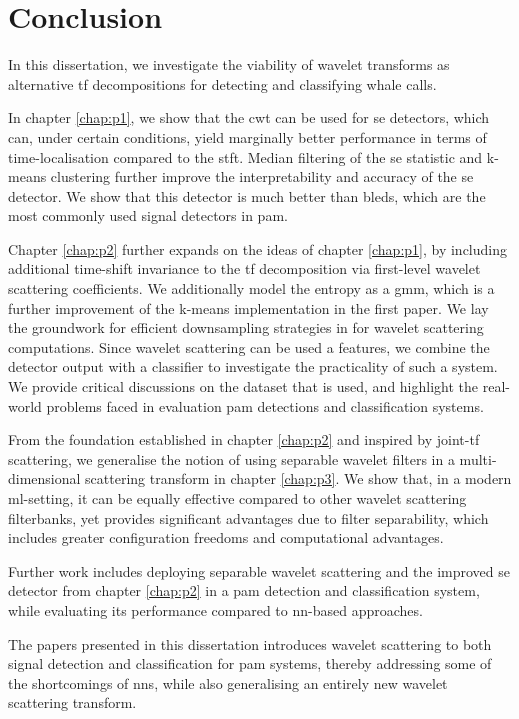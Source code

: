 \chapter{Conclusion}

In this dissertation, we investigate the viability of wavelet transforms as alternative \ac{tf} decompositions for detecting and classifying whale calls. 

In chapter \ref*{chap:p1}, we show that the \ac{cwt} can be used for \ac{se} detectors, which can, under certain conditions, yield marginally better performance in terms of time-localisation compared to the \ac{stft}. Median filtering of the \ac{se} statistic and k-means clustering further improve the interpretability and accuracy of the \ac{se} detector. We show that this detector is much better than \acp{bled}, which are the most commonly used signal detectors in \ac{pam}.

Chapter \ref*{chap:p2} further expands on the ideas of chapter \ref*{chap:p1}, by including additional time-shift invariance to the \ac{tf} decomposition via first-level wavelet scattering coefficients. We additionally model the entropy as a \ac{gmm}, which is a further improvement of the k-means implementation in the first paper. We lay the groundwork for efficient downsampling strategies in for wavelet scattering computations. Since wavelet scattering can be used a features, we combine the detector output with a classifier to investigate the practicality of such a system. We provide critical discussions on the dataset that is used, and highlight the real-world problems faced in evaluation \ac{pam} detections and classification systems.

From the foundation established in chapter \ref*{chap:p2} and inspired by joint-\ac{tf} scattering, we generalise the notion of using separable wavelet filters in a multi-dimensional scattering transform in chapter \ref*{chap:p3}. We show that, in a modern \ac{ml}-setting, it can be equally effective compared to other wavelet scattering filterbanks, yet provides significant advantages due to filter separability, which includes greater configuration freedoms and computational advantages. 

Further work includes deploying separable wavelet scattering and the improved \ac{se} detec\-tor from chapter \ref*{chap:p2} in a \ac{pam} detection and classification system, while evaluating its perfor\-mance compared to \ac{nn}-based approaches.

The papers presented in this dissertation introduces wavelet scattering to both signal detection and classification for \ac{pam} systems, thereby addressing some of the shortcomings of \acp{nn}, while also generalising an entirely new wavelet scattering transform.